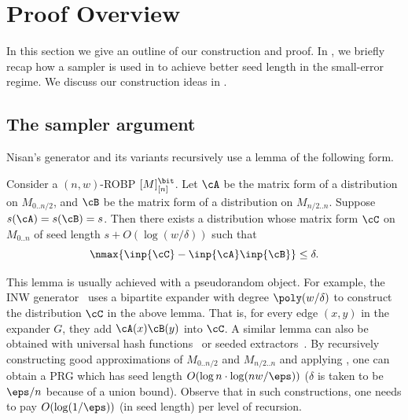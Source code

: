 \section{Proof Overview}\label{sec:proof-overview}
In this section we give an outline of our construction and proof. In , we briefly recap how a sampler is used in \cite{BCG18} to achieve better seed length in the small-error regime. We discuss our construction ideas in . 
\subsection{The sampler argument}\label{sec:samp-arg}
 Nisan's generator and its variants recursively use a lemma of the following form.
\begin{lemma}\label{lemma:INW}
Consider a $(n,w)$-ROBP $[M]_{[n]}^{\bit}$. Let $\cA$ be the matrix form of a distribution on $M_{0..n/2}$, and $\cB$ be the matrix form of a distribution on $M_{n/2..n}$. Suppose $s(\cA)=s(\cB)=s$. Then there exists a distribution whose matrix form $\cC$ on $M_{0..n}$ of seed length $s+O(\log(w/\delta))$ such that
$$\nmax{\inp{\cC}-\inp{\cA}\inp{\cB}}\le \delta.$$
\end{lemma}
This lemma is usually achieved with a pseudorandom object. For example, the INW generator~\cite{INW94} uses a bipartite expander with degree $\poly(w/\delta)$ to construct the distribution $\cC$ in the above lemma. That is, for every edge $(x,y)$ in the expander $G$, they  add $\cA(x)\cB(y)$ into $\cC$. A similar lemma can also be obtained with universal hash functions~\cite{Nis92} or seeded extractors~\cite{RR99}. By recursively constructing good approximations of $M_{0..n/2}$ and $M_{n/2..n}$ and applying , one can obtain a PRG which has seed length $O(\log n\cdot\log(nw/\eps))$ ($\delta$ is taken to be $\eps/n$ because of a union bound). Observe that in such constructions, one needs to pay $O(\log(1/\eps))$ (in seed length) per level of recursion. 

